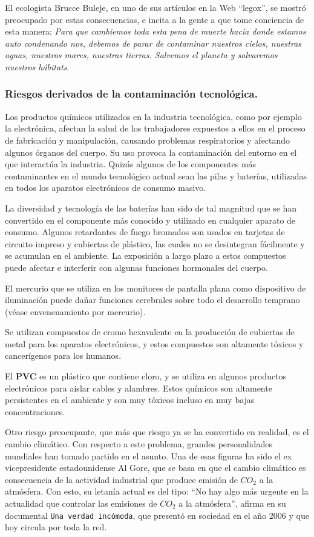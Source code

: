 El ecologista Brucce Buleje, en uno de sus artículos en la Web “legox”, se mostró
preocupado por estas consecuencias, e incita a la gente a que tome conciencia de esta
manera: \emph{Para que cambiemos toda esta pena de muerte hacia donde estamos auto
	condenando nos, debemos de parar de contaminar nuestros cielos, nuestras aguas,
	nuestros mares, nuestras tierras. Salvemos el planeta y salvaremos nuestros hábitats}.

\subsubsection{Riesgos derivados de la contaminación tecnológica.}

Los productos químicos utilizados en la industria tecnológica, como por ejemplo
la electrónica, afectan la salud de los trabajadores expuestos a ellos en el proceso de
fabricación y manipulación, causando problemas respiratorios y afectando algunos
órganos del cuerpo. Su uso provoca la contaminación del entorno en el que interactúa
la industria. Quizás algunos de los componentes más contaminantes en el mundo
tecnológico actual sean las pilas y baterías, utilizadas en todos los aparatos
electrónicos de consumo masivo.

La diversidad y tecnología de las baterías han sido de tal magnitud que se han convertido en el componente más conocido y utilizado en
cualquier aparato de consumo. Algunos retardantes de fuego bromados son usados en
tarjetas de circuito impreso y cubiertas de plástico, las cuales no se desintegran
fácilmente y se acumulan en el ambiente. La exposición a largo plazo a estos
compuestos puede afectar e interferir con algunas funciones hormonales del cuerpo.


El mercurio que se utiliza en los monitores de pantalla plana como dispositivo de
iluminación puede dañar funciones cerebrales sobre todo el desarrollo temprano
(véase envenenamiento por mercurio).

Se utilizan compuestos de cromo hexavalente en la producción de cubiertas de
metal para los aparatos electrónicos, y estos compuestos son altamente tóxicos y
cancerígenos para los humanos.

El \textbf{PVC} es un plástico que contiene cloro, y se utiliza en algunos productos
electrónicos para aislar cables y alambres. Estos químicos son altamente persistentes
en el ambiente y son muy tóxicos incluso en muy bajas concentraciones.

Otro riesgo preocupante, que más que riesgo ya se ha convertido en realidad, es
el cambio climático. Con respecto a este problema, grandes personalidades mundiales
han tomado partido en el asunto. Una de esas figuras ha sido el ex vicepresidente
estadounidense Al Gore, que se basa en que el cambio climático es consecuencia de la
actividad industrial que produce emisión de $CO_{2}$ a la atmósfera. Con esto, su letanía
actual es del tipo: ``No hay algo más urgente en la actualidad que controlar las
emisiones de $CO_{2}$ a la atmósfera'', afirma en su documental \texttt{Una verdad incómoda}, que
presentó en sociedad en el año 2006 y que hoy circula por toda la red.

